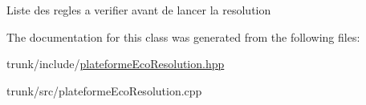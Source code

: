 Liste des regles a verifier avant de lancer la resolution 

The documentation for this class was generated from the following files:\begin{CompactItemize}
\item 
trunk/include/\hyperlink{plateformeEcoResolution_8hpp}{plateformeEcoResolution.hpp}\item 
trunk/src/plateformeEcoResolution.cpp\end{CompactItemize}
